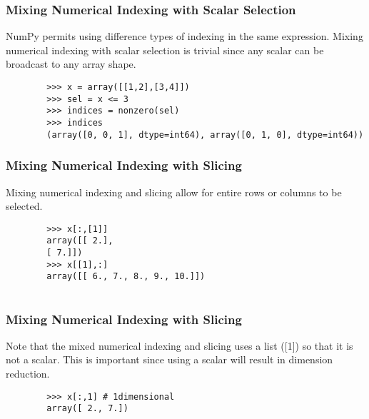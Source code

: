 \documentclass[KSmainSlides.tex]{subfiles}
\begin{document}
\begin{frame}[fragile]
	\frametitle{Mixing Numerical Indexing with Scalar Selection}
	NumPy permits using difference types of indexing in the same expression. Mixing numerical indexing
	with scalar selection is trivial since any scalar can be broadcast to any array shape.
	
	
	\begin{framed}
		\begin{verbatim}
		>>> x = array([[1,2],[3,4]])
		>>> sel = x <= 3
		>>> indices = nonzero(sel)
		>>> indices
		(array([0, 0, 1], dtype=int64), array([0, 1, 0], dtype=int64))
		\end{verbatim}
	\end{framed}
\end{frame}
\begin{frame}[fragile]
	\frametitle{Mixing Numerical Indexing with Slicing}
	
	Mixing numerical indexing and slicing allow for entire rows or columns to be selected.
	
	\begin{framed}
		\begin{verbatim}
		>>> x[:,[1]]
		array([[ 2.],
		[ 7.]])
		>>> x[[1],:]
		array([[ 6., 7., 8., 9., 10.]])
		
		\end{verbatim}
	\end{framed}
\end{frame}
\begin{frame}[fragile]	
	\frametitle{Mixing Numerical Indexing with Slicing}
	Note that the mixed numerical indexing and slicing uses a list ([1]) so that it is not a scalar. This is important
	since using a scalar will result in dimension reduction.
	
	
	\begin{framed}
		\begin{verbatim}
		>>> x[:,1] # 1dimensional
		array([ 2., 7.])
		\end{verbatim}
	\end{framed}
\end{frame}
\end{document}
